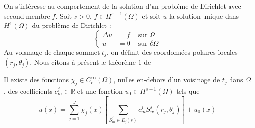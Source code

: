 \documentclass[11pt,a4paper]{article}
\begin{document}
On s'intéresse au comportement de la solution d'un problème de Dirichlet avec second membre $f$. Soit $s > 0$, $f \in H^{s-1}(\Omega)$ et soit $u$ la solution unique dans $H^{1}(\Omega)$ du problème de Dirichlet : 
\[\left\{\begin{array}{rcl}
\Delta u &= f & \text{ sur } \Omega \\
u & = 0 & \text{ sur } \partial \Omega
\end{array}\right.
\]
Au voisinage de chaque sommet $t_j$, on définit des coordonnées polaires locales $(r_j, \theta_j)$. Nous citons à présent le théorème $1$ de \cite{petersdorff1990decompositions}
\begin{The} Il existe des fonctions $\chi_j \in C^{\infty}_c(\Omega)$, nulles en-dehors d'un voisinage de $t_j$ dans $\Omega$, des coefficients $c_m^j \in \mathbb{R}$ et une fonction $u_0 \in H^{s+1}(\Omega)$ tels que 
\[ u(x) = \sum_{j=1}^J \chi_j(x) \left[\sum_{S_m^j \in E_j(s)} c_m^j S_m^j(r_j, \theta_j)\right]+ u_0(x)\] 
\end{The}
\end{document}
